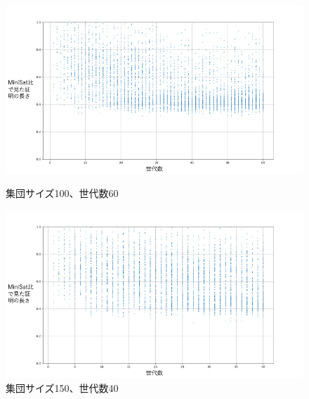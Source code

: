 \begin{figure}[h]
    \centering
    \begin{minipage}{0.43\columnwidth}
        \centering
        \includegraphics[width=\columnwidth]{figures/Experiment1/4-1.png}
        \caption{集団サイズ100、世代数60}
        \label{fig:サンプルA}
    \end{minipage}
    \hspace{5mm}
    \begin{minipage}{0.43\columnwidth}
        \centering
        \includegraphics[width=\columnwidth]{figures/Experiment1/4-2.png}
        \caption{集団サイズ150、世代数40}
        \label{fig:サンプルB}
    \end{minipage}
  
    \vspace{3mm}
    

\end{figure}
